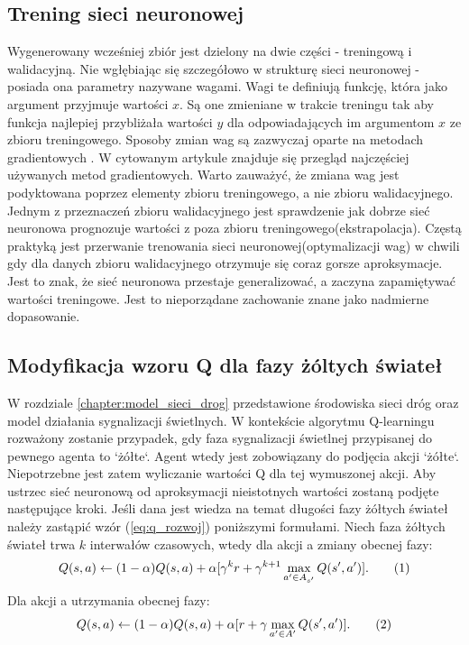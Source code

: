 \documentclass[12pt]{book}
\theoremstyle{plain}
\newcommand\addtag{\refstepcounter{equation}
\renewcommand{\labelenumii}{\theenumii}
\renewcommand{\theenumii}{\theenumi.\arabic{enumii}.}
\tag{\theequation}}
\newcommand{\myref}[1]{(\ref{#1})}
\begin{document}
\subsection{Trening sieci neuronowej}
Wygenerowany wcześniej zbiór jest dzielony na dwie części - treningową i walidacyjną. Nie wgłębiając się szczegółowo w strukturę sieci neuronowej - posiada ona parametry nazywane wagami. Wagi te definiują funkcję, która jako argument przyjmuje wartości $x$. Są one zmieniane w trakcie treningu tak aby funkcja najlepiej przybliżała wartości $y$ dla odpowiadających im argumentom $x$ ze zbioru treningowego. Sposoby zmian wag są zazwyczaj oparte na metodach gradientowych \cite{overview_optimizers}. W cytowanym artykule znajduje się przegląd najczęściej używanych metod gradientowych. Warto zauważyć, że zmiana wag jest podyktowana poprzez elementy zbioru treningowego, a nie zbioru walidacyjnego. Jednym z przeznaczeń zbioru walidacyjnego jest sprawdzenie jak dobrze sieć neuronowa prognozuje wartości z poza zbioru treningowego(ekstrapolacja). Częstą praktyką jest przerwanie trenowania sieci neuronowej(optymalizacji wag) w chwili gdy dla danych zbioru walidacyjnego otrzymuje się coraz gorsze aproksymacje. Jest to znak, że sieć neuronowa przestaje generalizować, a zaczyna zapamiętywać wartości treningowe. Jest to nieporządane zachowanie znane jako nadmierne dopasowanie. 
\subsection{Modyfikacja wzoru Q dla fazy żóltych świateł} \label{sec:q_mod}
W rozdziale \ref{chapter:model_sieci_drog} przedstawione środowiska sieci dróg oraz model działania sygnalizacji świetlnych. W kontekście algorytmu Q-learningu rozważony zostanie przypadek, gdy faza sygnalizacji świetlnej przypisanej do pewnego agenta to `żółte`. Agent wtedy jest zobowiązany do podjęcia akcji `żółte`. Niepotrzebne jest zatem wyliczanie wartości Q dla tej wymuszonej akcji. Aby ustrzec sieć neuronową od aproksymacji nieistotnych wartości zostaną podjęte następujące kroki. Jeśli dana jest wiedza na temat długości fazy żółtych świateł należy zastąpić wzór \myref{eq:q_rozwoj} poniższymi formułami. Niech faza żółtych świateł trwa $k$ interwałów czasowych, wtedy dla akcji a zmiany obecnej fazy:
\[Q(s,a) \leftarrow  (1-\alpha)Q(s,a) + \alpha [\gamma^{k} r + \gamma^{k+1} \max_{a' \in A_{s'}} Q(s',a')]. \addtag \label{eq:Q_DQN_II} \]
Dla akcji a utrzymania obecnej fazy:
\[Q(s,a) \leftarrow (1-\alpha)Q(s,a) + \alpha [r + \gamma \max_{a' \in A'} Q(s',a')]. \addtag \label{eq:Q_DQN_I} \]
\end{document}
